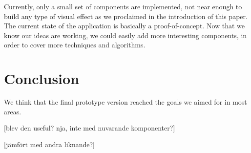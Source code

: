Currently, only a small set of components are implemented, not near enough to build any type of visual effect as we proclaimed in the introduction of this paper. The current state of the application is basically a proof-of-concept. Now that we know our ideas are working, we could easily add more interesting components, in order to cover more techniques and algorithms.

\chapter{Conclusion}
We think that the final prototype version reached the goals we aimed for in most areas.

[blev den useful? nja, inte med nuvarande komponenter?]

[jämfört med andra liknande?]

